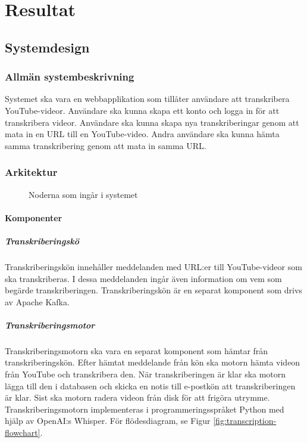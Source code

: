 \chapter{Resultat}

\section{Systemdesign}

\subsection{Allmän systembeskrivning}
Systemet ska vara en webbapplikation som tillåter användare att transkribera
YouTube-videor. Användare ska kunna skapa ett konto och logga in för att
transkribera videor. Användare ska kunna skapa nya transkriberingar genom att
mata in en URL till en YouTube-video. Andra användare ska kunna hämta samma
transkribering genom att mata in samma URL.

\subsection{Arkitektur}

\begin{figure}[h]
    \centering
    
    \caption{Noderna som ingår i systemet}
    \label{fig:system-nodes}
\end{figure}

\subsubsection{Komponenter}

\paragraph{Transkriberingskö}
Transkriberingskön innehåller meddelanden med URL:er till YouTube-videor som
ska transkriberas. I dessa meddelanden ingår även information om vem som
begärde transkriberingen. Transkriberingskön är en separat komponent som drivs
av Apache Kafka.

\paragraph{Transkriberingsmotor}
Transkriberingsmotorn ska vara en separat komponent som hämtar från
transkriberingskön. Efter hämtat meddelande från kön ska motorn hämta videon
från YouTube och transkribera den. När transkriberingen är klar ska motorn
lägga till den i databasen och skicka en notis till e-postkön att
transkriberingen är klar. Sist ska motorn radera videon från disk för att
frigöra utrymme. Transkriberingsmotorn implementeras i programmeringsspråket
Python med hjälp av OpenAI:s Whisper. För flödesdiagram, se Figur
\ref{fig:transcription-flowchart}.

